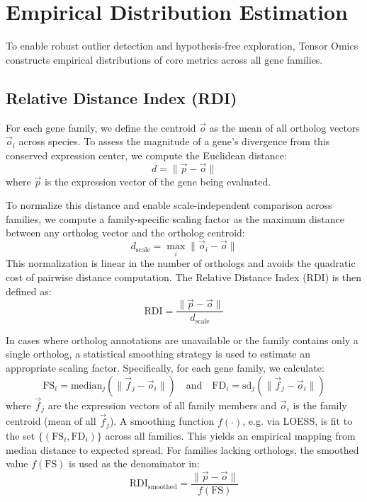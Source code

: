 \section{Empirical Distribution Estimation}\label{sec:empirical_distribution}

    To enable robust outlier detection and hypothesis-free exploration, Tensor Omics constructs empirical distributions of core metrics across all gene families.

    \subsection{Relative Distance Index (RDI)}

        For each gene family, we define the centroid \( \vec{o} \) as the mean of all ortholog vectors \( \vec{o}_i \) across species. To assess the magnitude of a gene's divergence from this conserved expression center, we compute the Euclidean distance:
        \[
            d = \| \vec{p} - \vec{o} \|
        \]
        where \( \vec{p} \) is the expression vector of the gene being evaluated.

        To normalize this distance and enable scale-independent comparison across families, we compute a family-specific scaling factor as the maximum distance between any ortholog vector and the ortholog centroid:
        \[
            d_{\text{scale}} = \max_i \| \vec{o}_i - \vec{o} \|
        \]
        This normalization is linear in the number of orthologs and avoids the quadratic cost of pairwise distance computation. The Relative Distance Index (RDI) is then defined as:
        \[
            \text{RDI} = \frac{\| \vec{p} - \vec{o} \|}{d_{\text{scale}}}
        \]

        In cases where ortholog annotations are unavailable or the family contains only a single ortholog, a statistical smoothing strategy is used to estimate an appropriate scaling factor. Specifically, for each gene family, we calculate:
        \[
            \text{FS}_i = \text{median}_j \left( \| \vec{f}_j - \vec{o}_i \| \right)
            \quad \text{and} \quad
            \text{FD}_i = \text{sd}_j \left( \| \vec{f}_j - \vec{o}_i \| \right)
        \]
        where \( \vec{f}_j \) are the expression vectors of all family members and \( \vec{o}_i \) is the family centroid (mean of all \( \vec{f}_j \)). A smoothing function \( f(\cdot) \), e.g. via LOESS, is fit to the set \( \{ (\text{FS}_i, \text{FD}_i) \} \) across all families. This yields an empirical mapping from median distance to expected spread. For families lacking orthologs, the smoothed value \( f(\text{FS}) \) is used as the denominator in:
        \[
            \text{RDI}_{\text{smoothed}} = \frac{\| \vec{p} - \vec{o} \|}{f(\text{FS})}
        \]

